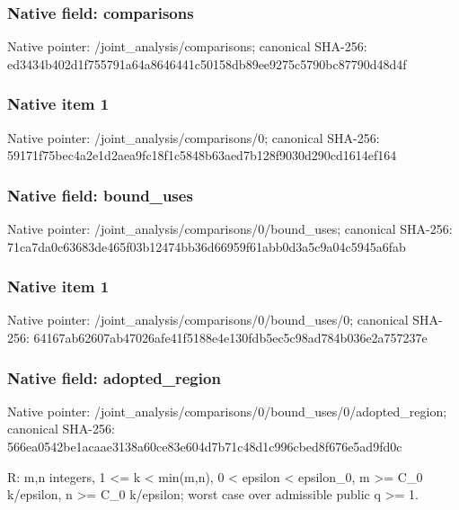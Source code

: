 \documentclass[10pt,a4paper]{article}
\begin{document}
\subsubsection{Native field: comparisons}
Native pointer: /joint\_\allowbreak{}analysis/comparisons; canonical SHA-256: ed3434b402d1f755791a64a8646441c50158db89ee9275c5790bc87790d48d4f

\subsubsection{Native item 1}
Native pointer: /joint\_\allowbreak{}analysis/comparisons/0; canonical SHA-256: 59171f75bec4a2e1d2aea9fc18f1c5848b63aed7b128f9030d290cd1614ef164

\subsubsection{Native field: bound\_\allowbreak{}uses}
Native pointer: /joint\_\allowbreak{}analysis/comparisons/0/bound\_\allowbreak{}uses; canonical SHA-256: 71ca7da0c63683de465f03b12474bb36d66959f61abb0d3a5c9a04c5945a6fab

\subsubsection{Native item 1}
Native pointer: /joint\_\allowbreak{}analysis/comparisons/0/bound\_\allowbreak{}uses/0; canonical SHA-256: 64167ab62607ab47026afe41f5188e4e130fdb5ec5c98ad784b036e2a757237e

\subsubsection{Native field: adopted\_\allowbreak{}region}
Native pointer: /joint\_\allowbreak{}analysis/comparisons/0/bound\_\allowbreak{}uses/0/adopted\_\allowbreak{}region; canonical SHA-256: 566ea0542be1acaae3138a60ce83e604d7b71c48d1c996cbed8f676e5ad9fd0c

\begingroup\raggedright\sloppy R:\allowbreak{} m,\allowbreak{}n integers,\allowbreak{} 1 <=\allowbreak{} k < min(m,\allowbreak{}n),\allowbreak{} 0 < epsilon < epsilon\_\allowbreak{}0,\allowbreak{} m >=\allowbreak{} C\_\allowbreak{}0 k/\allowbreak{}epsilon,\allowbreak{} n >=\allowbreak{} C\_\allowbreak{}0 k/\allowbreak{}epsilon;\allowbreak{} worst case over admissible public q >=\allowbreak{} 1.\par\endgroup
\end{document}
